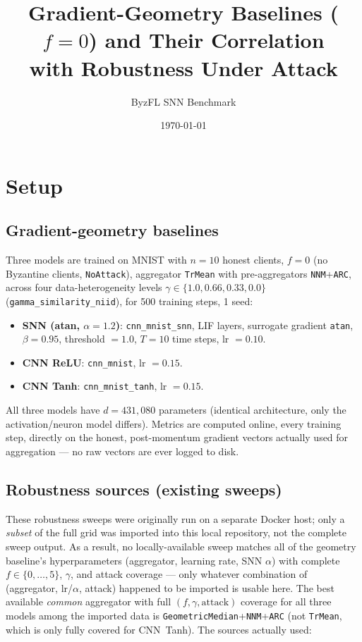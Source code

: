 \documentclass{article}
\title{Gradient-Geometry Baselines ($f=0$) and Their Correlation\\with Robustness Under Attack}
\author{ByzFL SNN Benchmark}
\date{\today}
\begin{document}
\maketitle

\tableofcontents
\newpage

\section{Setup}

\subsection{Gradient-geometry baselines}
Three models are trained on MNIST with $n=10$ honest clients, $f=0$ (no Byzantine clients, \texttt{NoAttack}), aggregator \texttt{TrMean} with pre-aggregators \texttt{NNM}+\texttt{ARC}, across four data-heterogeneity levels $\gamma \in \{1.0, 0.66, 0.33, 0.0\}$ (\texttt{gamma\_similarity\_niid}), for 500 training steps, 1 seed:
\begin{itemize}
    \item \textbf{SNN (atan, $\alpha=1.2$)}: \texttt{cnn\_mnist\_snn}, LIF layers, surrogate gradient \texttt{atan}, $\beta=0.95$, threshold $=1.0$, $T=10$ time steps, lr $=0.10$.
    \item \textbf{CNN ReLU}: \texttt{cnn\_mnist}, lr $=0.15$.
    \item \textbf{CNN Tanh}: \texttt{cnn\_mnist\_tanh}, lr $=0.15$.
\end{itemize}
All three models have $d = 431{,}080$ parameters (identical architecture, only the activation/neuron model differs). Metrics are computed online, every training step, directly on the honest, post-momentum gradient vectors actually used for aggregation --- no raw vectors are ever logged to disk.

\subsection{Robustness sources (existing sweeps)}
\label{sec:robustness-sources}
These robustness sweeps were originally run on a separate Docker host; only a \emph{subset} of the full grid was imported into this local repository, not the complete sweep output. As a result, no locally-available sweep matches all of the geometry baseline's hyperparameters (aggregator, learning rate, SNN $\alpha$) with complete $f\in\{0,\dots,5\}$, $\gamma$, and attack coverage --- only whatever combination of (aggregator, lr/$\alpha$, attack) happened to be imported is usable here. The best available \emph{common} aggregator with full $(f,\gamma,\text{attack})$ coverage for all three models among the imported data is \texttt{GeometricMedian}+\texttt{NNM}+\texttt{ARC} (not \texttt{TrMean}, which is only fully covered for CNN~Tanh). The sources actually used:
\end{document}

